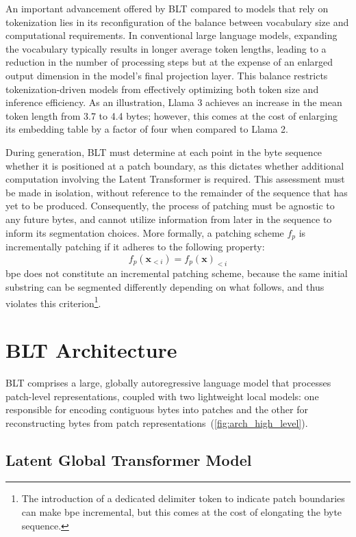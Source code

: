 An important advancement offered by {\textsc BLT} compared to models that rely on tokenization lies in its reconfiguration of the balance between vocabulary size and computational requirements. In conventional large language models, expanding the vocabulary typically results in longer average token lengths, leading to a reduction in the number of processing steps but at the expense of an enlarged output dimension in the model's final projection layer. This balance restricts tokenization-driven models from effectively optimizing both token size and inference efficiency. As an illustration, Llama 3 achieves an increase in the mean token length from 3.7 to 4.4 bytes; however, this comes at the cost of enlarging its embedding table by a factor of four when compared to Llama 2.

During generation, {\textsc BLT} must determine at each point in the byte sequence whether it is positioned at a patch boundary, as this dictates whether additional computation involving the Latent Transformer is required. This assessment must be made in isolation, without reference to the remainder of the sequence that has yet to be produced. Consequently, the process of patching must be agnostic to any future bytes, and cannot utilize information from later in the sequence to inform its segmentation choices. More formally, a patching scheme $f_p$ is incrementally patching if it adheres to the following property:
$$f_p(\pmb{x}_{<i}) = f_p(\pmb{x})_{<i}$$
bpe does not constitute an incremental patching scheme, because the same initial substring can be segmented differently depending on what follows, and thus violates this criterion\footnote{The introduction of a dedicated delimiter token to indicate patch boundaries can make bpe incremental, but this comes at the cost of elongating the byte sequence.}.

\section{{\textsc BLT} Architecture}
\label{section:architecture}
{\textsc BLT} comprises a large, globally autoregressive language model that processes patch-level representations, coupled with two lightweight local models: one responsible for encoding contiguous bytes into patches and the other for reconstructing bytes from patch representations~(\autoref{fig:arch_high_level}).

\subsection{Latent Global Transformer Model}

